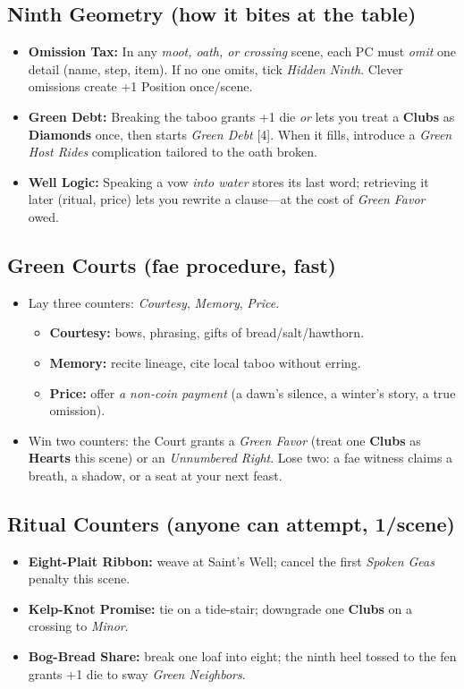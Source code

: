 \subsection*{Ninth Geometry (how it bites at the table)}
\begin{itemize}
  \item \textbf{Omission Tax:} In any \emph{moot, oath, or crossing} scene, each PC must \emph{omit} one detail (name, step, item). If no one omits, tick \emph{Hidden Ninth}. Clever omissions create +1 Position once/scene.
  \item \textbf{Green Debt:} Breaking the taboo grants +1 die \emph{or} lets you treat a \textbf{Clubs} as \textbf{Diamonds} once, then starts \emph{Green Debt} [4]. When it fills, introduce a \emph{Green Host Rides} complication tailored to the oath broken.
  \item \textbf{Well Logic:} Speaking a vow \emph{into water} stores its last word; retrieving it later (ritual, price) lets you rewrite a clause—at the cost of \emph{Green Favor} owed.
\end{itemize}

\subsection*{Green Courts (fae procedure, fast)}
\begin{itemize}
  \item Lay three counters: \emph{Courtesy}, \emph{Memory}, \emph{Price}.  
    \begin{itemize}
      \item \textbf{Courtesy:} bows, phrasing, gifts of bread/salt/hawthorn.  
      \item \textbf{Memory:} recite lineage, cite local taboo without erring.  
      \item \textbf{Price:} offer \emph{a non-coin payment} (a dawn’s silence, a winter’s story, a true omission).
    \end{itemize}
  \item Win two counters: the Court grants a \emph{Green Favor} (treat one \textbf{Clubs} as \textbf{Hearts} this scene) or an \emph{Unnumbered Right}. Lose two: a fae witness claims a breath, a shadow, or a seat at your next feast.
\end{itemize}

\subsection*{Ritual Counters (anyone can attempt, 1/scene)}
\begin{itemize}
  \item \textbf{Eight-Plait Ribbon:} weave at Saint’s Well; cancel the first \emph{Spoken Geas} penalty this scene. 
  \item \textbf{Kelp-Knot Promise:} tie on a tide-stair; downgrade one \textbf{Clubs} on a crossing to \emph{Minor}. 
  \item \textbf{Bog-Bread Share:} break one loaf into eight; the ninth heel tossed to the fen grants +1 die to sway \emph{Green Neighbors}.
\end{itemize}

